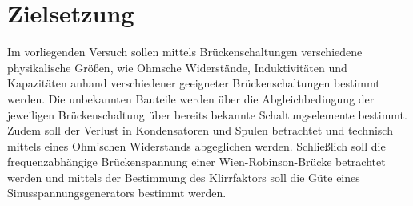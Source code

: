 \section{Zielsetzung}
\label{sec:Zielsetzung}
Im vorliegenden Versuch sollen mittels Brückenschaltungen verschiedene physikalische Größen, wie Ohmsche Widerstände, Induktivitäten und Kapazitäten
anhand verschiedener geeigneter Brückenschaltungen bestimmt werden.
Die unbekannten Bauteile werden über die Abgleichbedingung der jeweiligen Brückenschaltung über bereits bekannte Schaltungselemente bestimmt.
Zudem soll der Verlust in Kondensatoren und Spulen betrachtet und technisch mittels eines Ohm'schen Widerstands abgeglichen werden.
Schließlich soll die frequenzabhängige Brückenspannung einer Wien-Robinson-Brücke betrachtet werden und mittels der Bestimmung des Klirrfaktors soll die Güte
eines Sinusspannungsgenerators bestimmt werden.
